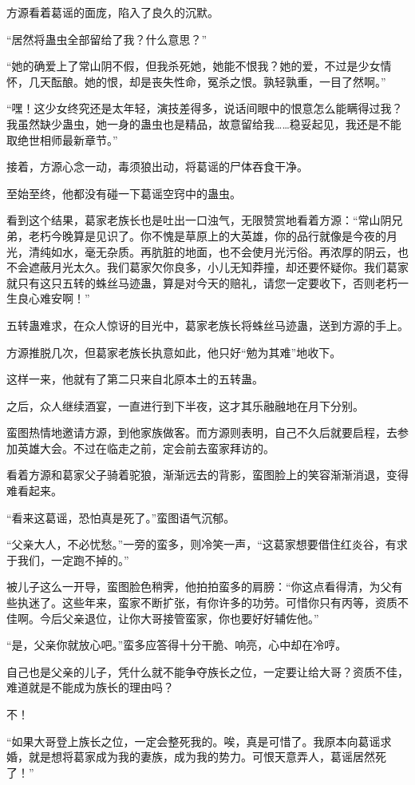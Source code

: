 \begin{this_body}
方源看着葛谣的面庞，陷入了良久的沉默。

“居然将蛊虫全部留给了我？什么意思？”

“她的确爱上了常山阴不假，但我杀死她，她能不恨我？她的爱，不过是少女情怀，几天酝酿。她的恨，却是丧失性命，冤杀之恨。孰轻孰重，一目了然啊。”

“嘿！这少女终究还是太年轻，演技差得多，说话间眼中的恨意怎么能瞒得过我？我虽然缺少蛊虫，她一身的蛊虫也是精品，故意留给我……稳妥起见，我还是不能取绝世相师最新章节。”

接着，方源心念一动，毒须狼出动，将葛谣的尸体吞食干净。

至始至终，他都没有碰一下葛谣空窍中的蛊虫。

看到这个结果，葛家老族长也是吐出一口浊气，无限赞赏地看着方源：“常山阴兄弟，老朽今晚算是见识了。你不愧是草原上的大英雄，你的品行就像是今夜的月光，清纯如水，毫无杂质。再肮脏的地面，也不会使月光污俗。再浓厚的阴云，也不会遮蔽月光太久。我们葛家欠你良多，小儿无知莽撞，却还要怀疑你。我们葛家就只有这只五转的蛛丝马迹蛊，算是对今天的赔礼，请您一定要收下，否则老朽一生良心难安啊！”

五转蛊难求，在众人惊讶的目光中，葛家老族长将蛛丝马迹蛊，送到方源的手上。

方源推脱几次，但葛家老族长执意如此，他只好“勉为其难”地收下。

这样一来，他就有了第二只来自北原本土的五转蛊。

之后，众人继续酒宴，一直进行到下半夜，这才其乐融融地在月下分别。

蛮图热情地邀请方源，到他家族做客。而方源则表明，自己不久后就要启程，去参加英雄大会。不过在临走之前，定会前去蛮家拜访的。

看着方源和葛家父子骑着驼狼，渐渐远去的背影，蛮图脸上的笑容渐渐消退，变得难看起来。

“看来这葛谣，恐怕真是死了。”蛮图语气沉郁。

“父亲大人，不必忧愁。”一旁的蛮多，则冷笑一声，“这葛家想要借住红炎谷，有求于我们，一定跑不掉的。”

被儿子这么一开导，蛮图脸色稍霁，他拍拍蛮多的肩膀：“你这点看得清，为父有些执迷了。这些年来，蛮家不断扩张，有你许多的功劳。可惜你只有丙等，资质不佳啊。今后父亲退位，让你大哥接管蛮家，你也要好好辅佐他。”

“是，父亲你就放心吧。”蛮多应答得十分干脆、响亮，心中却在冷哼。

自己也是父亲的儿子，凭什么就不能争夺族长之位，一定要让给大哥？资质不佳，难道就是不能成为族长的理由吗？

不！

“如果大哥登上族长之位，一定会整死我的。唉，真是可惜了。我原本向葛谣求婚，就是想将葛家成为我的妻族，成为我的势力。可恨天意弄人，葛谣居然死了！”


\end{this_body}
